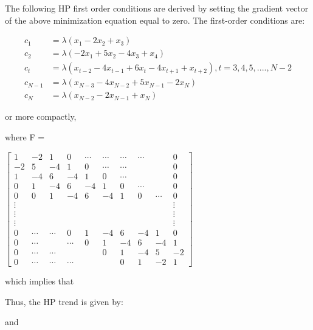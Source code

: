 The following HP first order conditions are derived by setting the gradient vector of the above minimization equation equal to zero. The first-order conditions are:
\begin{flushleft}
\begin{align}
c_1&=\lambda(x_1-2x_2+x_3)  \nonumber \\
c_2&=\lambda(-2x_1+5x_2-4x_3+x_4) \nonumber \\
c_t&=\lambda(x_{t-2}-4x_{t-1}+6x_t-4x_{t+1}+x_{t+2}), t=3,4,5,....,N-2 \nonumber \\
c_{N-1}&=\lambda(x_{N-3}-4x_{N-2}+5x_{N-1}-2x_N) \nonumber \\
c_{N}&=\lambda(x_{N-2}-2x_{N-1}+x_N) \nonumber
\end{align}
\end{flushleft}
or more compactly, 
\begin{center}
\end{center}
\unboldmath
where F = 
\begin{flushright}
$\begin{bmatrix}
1 & -2 & 1 & 0 & \cdots & \cdots & \cdots &\cdots & & 0 \\
-2 & 5 & -4 & 1 & 0 & \cdots & \cdots & & & 0 \\
1 & -4 & 6 & -4 & 1 & 0 & \cdots &  & & 0 \\
0 & 1 & -4 & 6 & -4 & 1 & 0 & \cdots & &  0 \\
0 & 0 & 1 & -4 & 6 & -4 & 1 & 0  &\cdots  & 0 \\
\vdots & & & & & & & & & \vdots \\
\vdots & & & & & & & & & \vdots \\
\vdots & & & & & & & & & \vdots \\
0 & \cdots & \cdots & 0 & 1 & -4 & 6 & -4 & 1 & 0 \\
0 & \cdots & & \cdots &   0 & 1 & -4 & 6 & -4 & 1 \\
0 & \cdots & \cdots &  &  & 0 & 1 & -4 & 5 & -2 \\
0 & \cdots & \cdots & \cdots &  &  & 0& 1 & -2 & 1 
\end{bmatrix}$
\end{flushright}

which implies that 

\begin{center}
\unboldmath
\end{center}
Thus, the HP trend is given by:
\begin{center}
\unboldmath
\end{center}
and
\begin{center}
\unboldmath
\end{center}

